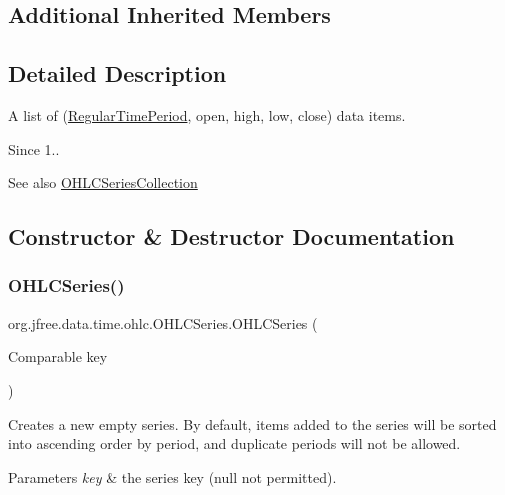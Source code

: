 \subsection*{Additional Inherited Members}


\subsection{Detailed Description}
A list of (\mbox{\hyperlink{classorg_1_1jfree_1_1data_1_1time_1_1_regular_time_period}{Regular\+Time\+Period}}, open, high, low, close) data items.

\begin{DoxySince}{Since}
1..
\end{DoxySince}
\begin{DoxySeeAlso}{See also}
\mbox{\hyperlink{classorg_1_1jfree_1_1data_1_1time_1_1ohlc_1_1_o_h_l_c_series_collection}{O\+H\+L\+C\+Series\+Collection}} 
\end{DoxySeeAlso}


\subsection{Constructor \& Destructor Documentation}
\mbox{\label{classorg_1_1jfree_1_1data_1_1time_1_1ohlc_1_1_o_h_l_c_series_affe626c978fe6af4306fab8e0c3a20ea}} 
\subsubsection{\texorpdfstring{O\+H\+L\+C\+Series()}{OHLCSeries()}}
{\footnotesize\ttfamily org.\+jfree.\+data.\+time.\+ohlc.\+O\+H\+L\+C\+Series.\+O\+H\+L\+C\+Series (\begin{DoxyParamCaption}\item[{Comparable}]{key }\end{DoxyParamCaption})}

Creates a new empty series. By default, items added to the series will be sorted into ascending order by period, and duplicate periods will not be allowed.


\begin{DoxyParams}{Parameters}
{\em key} & the series key ({\ttfamily null} not permitted). \\
\hline
\end{DoxyParams}


